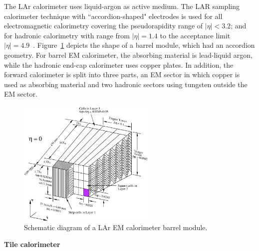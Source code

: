 The LAr calorimeter uses liquid-argon as active medium.
The LAR sampling calorimeter technique with ``accordion-shaped" electrodes is used for all electromagnetic calorimetry covering the pseudorapidity range of $|\eta|<3.2$;
and for hadronic calorimetry with range from $|\eta| = 1.4$ to the acceptance limit $|\eta| = 4.9$~\cite{CERN-LHCC-96-041}.
Figure~\ref{fig:calo_lar} depicts the shape of a barrel module, which had an accordion geometry.
For barrel EM calorimeter, the absorbing material is lead-liquid argon, while the hadronic end-cap calorimeter uses copper plates.
In addition, the forward calorimeter is split into three parts, an EM sector in which copper is used as absorbing material and two hadronic sectors using tungsten outside the EM sector.
\begin{figure}[!htb]
  \centering
  \includegraphics[width=0.6\textwidth]{figures/Detector/calo_lar.png}
  \caption{Schematic diagram of a LAr EM calorimeter barrel module.}
  \label{fig:calo_lar}
\end{figure}

\textbf{Tile calorimeter}

